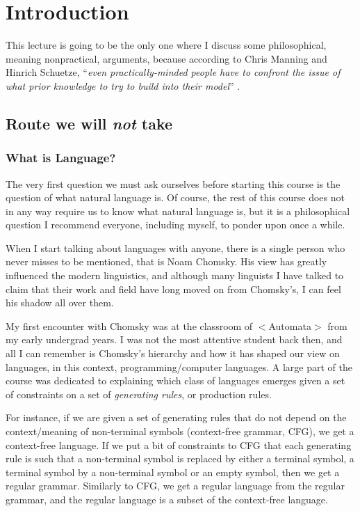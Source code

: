 \documentclass{report}
\begin{document}
\tableofcontents

\chapter{Introduction}
\label{chap:intro}

This lecture is going to be the only one where I discuss some philosophical,
meaning nonpractical, arguments, because according to Chris Manning and Hinrich
Schuetze, ``\emph{even practically-minded people have to confront the issue of
what prior knowledge to try to build into their model}''
\citep{manning1999foundations}.

\section{Route we will \emph{not} take}
\label{sec:wrong_route}

\subsection{What is Language?}

The very first question we must ask ourselves before starting this course is the
question of what natural language is. Of course, the rest of this course does
not in any way require us to know what natural language is, but it is a
philosophical question I recommend everyone, including myself, to ponder upon
once a while. 

When I start talking about languages with anyone, there is a single person who
never misses to be mentioned, that is Noam Chomsky. His view has greatly
influenced the modern linguistics, and although many linguists I have talked to
claim that their work and field have long moved on from Chomsky's, I can feel
his shadow all over them. 

My first encounter with Chomsky was at the classroom of $<$Automata$>$ from my
early undergrad years. I was not the most attentive student back then, and all I
can remember is Chomsky's hierarchy and how it has shaped our view on languages,
in this context, programming/computer languages.  A large part of the course was
dedicated to explaining which class of languages emerges given a set of
constraints on a set of \emph{generating rules}, or production rules. 

For instance, if we are given a set of generating rules that do not depend on
the context/meaning of non-terminal symbols (context-free grammar, CFG), we get
a context-free language. If we put a bit of constraints to CFG that each
generating rule is such that a non-terminal symbol is replaced by either a
terminal symbol, a terminal symbol by a non-terminal symbol or an empty symbol,
then we get a regular grammar. Similarly to CFG, we get a regular language from
the regular grammar, and the regular language is a subset of the context-free
language.
\end{document}
